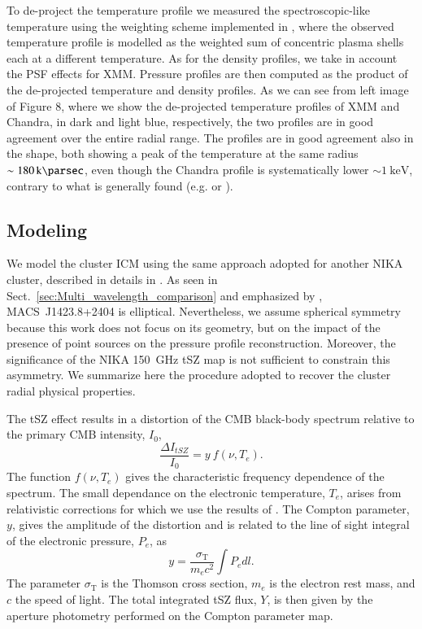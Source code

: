 \documentclass[twocolumn,traditabstract]{aa}
\begin{document}
To de-project the temperature profile we measured the spectroscopic-like temperature \citep{mazzotta2004} using the weighting scheme implemented in \cite{vikh_multit}, where the observed temperature profile is modelled as the weighted sum of concentric plasma shells each at a different temperature. As for the density profiles, we take in account the PSF effects for XMM. Pressure profiles are then computed as the product of the de-projected temperature and density profiles. As we can see from left image of Figure 8, where we show the de-projected temperature profiles of XMM and Chandra, in dark and light blue, respectively, the two profiles are in good agreement over the entire radial range. The profiles are in good agreement also in the shape, both showing a peak of the temperature at the same radius $\sim \SI{180}{\kilo\parsec}$, even though the Chandra profile is systematically lower $\sim \SI{1}{\kilo\electronvolt}$, contrary to what is generally found (e.g. \citealt{mahdavi2013} or \citealt{martino2014}). 

\subsection{Modeling}\label{sec:modeling}
We model the cluster ICM using the same approach adopted for another NIKA cluster, described in details in \cite{adam2014}. As seen in Sect.~\ref{sec:Multi_wavelength_comparison} and emphasized by \cite{morandi2010}, \mbox{MACS~J1423.8+2404} is elliptical. Nevertheless, we assume spherical symmetry because this work does not focus on its geometry, but on the impact of the presence of point sources on the pressure profile reconstruction. Moreover, the significance of the NIKA 150~GHz tSZ map is not sufficient to constrain this asymmetry. We summarize here the procedure adopted to recover the cluster radial physical properties.

The tSZ effect \citep{sunyaev1972,sunyaev1980} results in a distortion of the CMB black-body spectrum relative to the primary CMB intensity, $I_0$, \citep[e.g.][]{birkinshaw1999}
\begin{equation}
	\frac{\Delta I_{tSZ}}{I_0} = y \ f(\nu, T_e).
\label{eq:deltaI}
\end{equation}
The function $f(\nu, T_e)$ gives the characteristic frequency dependence of the spectrum. The small dependance on the electronic temperature, $T_e$, arises from relativistic corrections for which we use the results of \cite{itoh1998}. The Compton parameter, $y$, gives the amplitude of the distortion and is related to the line of sight integral of the electronic pressure, $P_e$, as 
\begin{equation}
	y = \frac{\sigma_{\mathrm{T}}}{m_{e} c^2} \int P_{e} dl.
	\label{eq:y_compton}
   \end{equation}
The parameter $\sigma_{\mathrm{T}}$ is the Thomson cross section, $m_{e}$ is the electron rest mass, and $c$ the speed of light. The total integrated tSZ flux, $Y$, is then given by the aperture photometry performed on the Compton parameter map.
\end{document}
